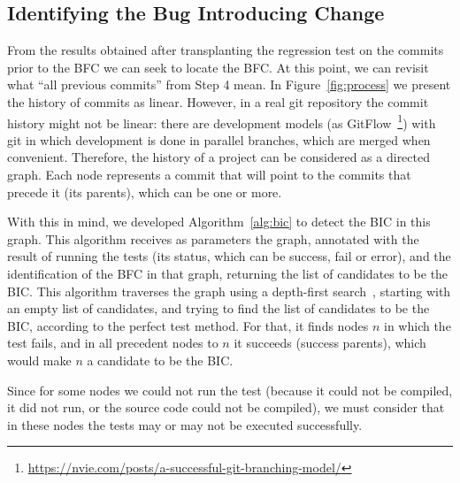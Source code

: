 \subsection{Identifying the Bug Introducing Change}
\label{subsec:identify-bic}

From the results obtained after transplanting the regression test on the commits prior to the BFC we can seek to locate the BFC.
At this point, we can revisit what ``all previous commits'' from Step 4 mean. 
In Figure~\ref{fig:process} we present the history of commits as linear. 
However, in a real git repository the commit history might not be linear: there are development models (as GitFlow~\footnote{\url{https://nvie.com/posts/a-successful-git-branching-model/}}) with git in which development is done in parallel branches, which are merged when convenient. 
Therefore, the history of a project can be considered as a directed graph. 
Each node represents a commit that will point to the commits that precede it (its parents), which can be one or more.

With this in mind, we developed Algorithm~\ref{alg:bic} to detect the BIC in this graph. 
This algorithm receives as parameters the graph, annotated with the result of running the tests (its status, which can be success, fail or error), and the identification of the BFC in that graph, returning the list of candidates to be the BIC. 
This algorithm traverses the graph using a depth-first search~\cite{cormen2022depthfirstsearch}, starting with an empty list of candidates, and trying to find the list of candidates to be the BIC, according to the perfect test method. 
For that, it finds nodes $n$ in which the test fails, and in all precedent nodes to $n$ it succeeds (success parents), which would make $n$ a candidate to be the BIC.

Since for some nodes we could not run the test (because it could not be compiled, it did not run, or the source code could not be compiled), we must consider that in these nodes the tests may or may not be executed successfully.


